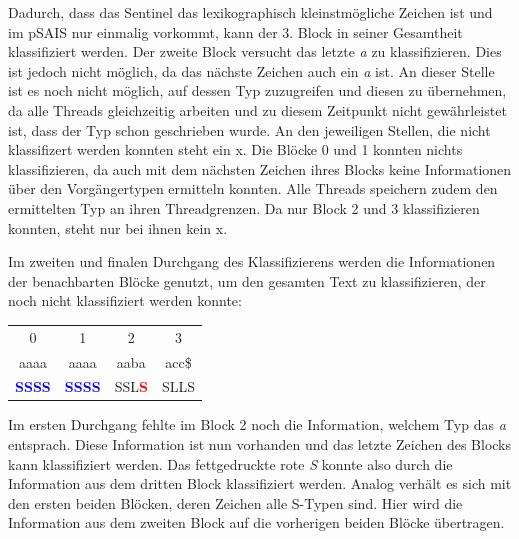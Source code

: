 Dadurch, dass das Sentinel das lexikographisch kleinstmögliche Zeichen ist und im pSAIS nur einmalig vorkommt, kann der 3. Block in seiner Gesamtheit klassifiziert werden. Der zweite Block versucht das letzte \textit{a} zu klassifizieren. Dies ist jedoch nicht möglich, da das nächste Zeichen auch ein \textit{a} ist. An dieser Stelle ist es noch nicht möglich, auf dessen Typ zuzugreifen und diesen zu übernehmen, da alle Threads gleichzeitig arbeiten und zu diesem Zeitpunkt nicht gewährleistet ist, dass der Typ schon geschrieben wurde. An den jeweiligen Stellen, die nicht klassifizert werden konnten steht ein x. Die Blöcke 0 und 1 konnten nichts klassifizieren, da auch mit dem nächsten Zeichen ihres Blocks keine Informationen über den Vorgängertypen ermitteln konnten. Alle Threads speichern zudem den ermittelten Typ an ihren Threadgrenzen. Da nur Block 2 und 3 klassifizieren konnten, steht nur bei ihnen kein x.

Im zweiten und finalen Durchgang des Klassifizierens werden die Informationen der benachbarten Blöcke genutzt, um den gesamten Text zu klassifizieren, der noch nicht klassifiziert werden konnte:

\begin{center}
	\begin{tabular}{c|c|c|c}      
		           0     	&             1         &           2           &             3    \\ 
          	aaaa     		&          aaaa         &        aaba           &          acc\$    \\            
\textbf{\textcolor{blue}{S}}\textbf{\textcolor{blue}{S}}\textbf{\textcolor{blue}{S}}\textbf{\textcolor{blue}{S}} &  \textbf{\textcolor{blue}{S}}\textbf{\textcolor{blue}{S}}\textbf{\textcolor{blue}{S}}\textbf{\textcolor{blue}{S}} & SSL\textbf{\textcolor{red}{S}}  & SLLS     \\             	       
	\end{tabular}
\end{center}

Im ersten Durchgang fehlte im Block 2 noch die Information, welchem Typ das \textit{a} entsprach. Diese Information ist nun vorhanden und das letzte Zeichen des Blocks kann klassifiziert werden. Das fettgedruckte rote \textit{S} konnte also durch die Information aus dem dritten Block klassifiziert werden. Analog verhält es sich mit den ersten beiden Blöcken, deren Zeichen alle S-Typen sind. Hier wird die Information aus dem zweiten Block auf die vorherigen beiden Blöcke übertragen.


